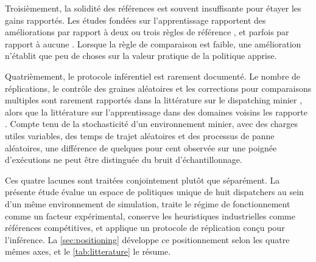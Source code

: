 \documentclass[11pt,a4paper]{article}
\begin{document}
Troisièmement, la solidité des références est souvent insuffisante pour étayer les gains rapportés. Les études fondées sur l'apprentissage rapportent des améliorations par rapport à deux ou trois règles de référence \cite{Zhao2025}, et parfois par rapport à aucune \cite{deCarvalho2023}. Lorsque la règle de comparaison est faible, une amélioration n'établit que peu de choses sur la valeur pratique de la politique apprise.

Quatrièmement, le protocole inférentiel est rarement documenté. Le nombre de réplications, le contrôle des graines aléatoires et les corrections pour comparaisons multiples sont rarement rapportés dans la littérature sur le dispatching minier \cite{MehrnazMohtasham2023, MiladAbolghasemian2020, BurakOzdemir2019}, alors que la littérature sur l'apprentissage dans des domaines voisins les rapporte \cite{MohammadrezaNazari2018, CongZhang2020}. Compte tenu de la stochasticité d'un environnement minier, avec des charges utiles variables, des temps de trajet aléatoires et des processus de panne aléatoires, une différence de quelques pour cent observée sur une poignée d'exécutions ne peut être distinguée du bruit d'échantillonnage.

Ces quatre lacunes sont traitées conjointement plutôt que séparément. La présente étude évalue un espace de politiques unique de huit dispatchers au sein d'un même environnement de simulation, traite le régime de fonctionnement comme un facteur expérimental, conserve les heuristiques industrielles comme références compétitives, et applique un protocole de réplication conçu pour l'inférence. La \cref{sec:positioning} développe ce positionnement selon les quatre mêmes axes, et le \cref{tab:litterature} le résume.


\end{document}
